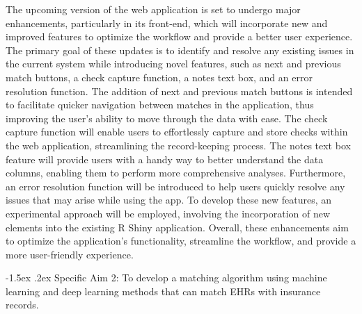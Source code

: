 \documentclass[11pt,]{article}
\makeatletter
\renewcommand\paragraph{
  \@startsection{paragraph}{4}{\z@}
    {-0.5ex\@plus -1ex \@minus -.2ex}%
    {-1.5ex \@plus .2ex}%
    {\normalfont\normalsize\bf}} %
\makeatother
\begin{document}
The upcoming version of the web application is set to undergo major
enhancements, particularly in its front-end, which will incorporate new
and improved features to optimize the workflow and provide a better user
experience. The primary goal of these updates is to identify and resolve
any existing issues in the current system while introducing novel
features, such as next and previous match buttons, a check capture
function, a notes text box, and an error resolution function. The
addition of next and previous match buttons is intended to facilitate
quicker navigation between matches in the application, thus improving
the user's ability to move through the data with ease. The check capture
function will enable users to effortlessly capture and store checks
within the web application, streamlining the record-keeping process. The
notes text box feature will provide users with a handy way to better
understand the data columns, enabling them to perform more comprehensive
analyses. Furthermore, an error resolution function will be introduced
to help users quickly resolve any issues that may arise while using the
app. To develop these new features, an experimental approach will be
employed, involving the incorporation of new elements into the existing
R Shiny application. Overall, these enhancements aim to optimize the
application's functionality, streamline the workflow, and provide a more
user-friendly experience.

\paragraph{Specific Aim 2: To develop a matching algorithm using machine
learning and deep learning methods that can match EHRs with insurance
records.}\label{specific-aim-2-to-develop-a-matching-algorithm-using-machine-learning-and-deep-learning-methods-that-can-match-ehrs-with-insurance-records.}
\end{document}
